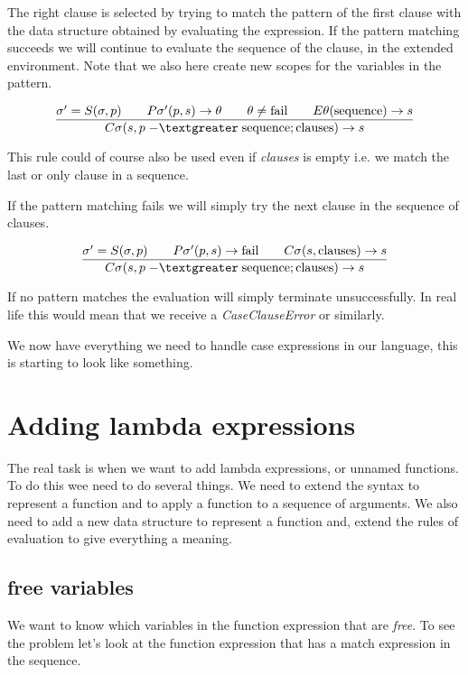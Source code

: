\documentclass[a4paper,11pt]{article}
\begin{document}
The right clause is selected by trying to match the pattern of the
first clause with the data structure obtained by evaluating the
expression. If the pattern matching succeeds we will continue to
evaluate the sequence of the clause, in the extended environment. Note
that we also here create new scopes for the variables in the pattern.

$$\frac{
  \sigma' = S(\sigma, p) \qquad
  P\sigma'(p, s) \rightarrow \theta \qquad
  \theta \not = {\rm fail} \qquad
  E\theta({\rm sequence}) \rightarrow s}{
C\sigma(s, p \;{\rm -\textgreater}\;    {\rm sequence} ; {\rm clauses}) \rightarrow s}$$

This rule could of course also be used even if {\em clauses} is empty
i.e. we match the last or only clause in a sequence.

If the pattern matching fails we will simply try the next clause in
the sequence of clauses.

$$\frac{
  \sigma' = S(\sigma, p) \qquad
  P\sigma'(p, s) \rightarrow {\rm fail} \qquad
  C\sigma(s, {\rm clauses}) \rightarrow s}{
C\sigma(s, p \;{\rm -\textgreater}\;  {\rm sequence} ; {\rm clauses}) \rightarrow s}$$

If no pattern matches the evaluation will simply terminate
unsuccessfully. In real life this would mean that we receive a {\em
  CaseClauseError} or similarly.

We now have everything we need to handle case expressions in our
language, this is starting to look like something.

\section{Adding lambda expressions}

The real task is when we want to add lambda expressions, or unnamed
functions. To do this wee need to do several things. We need to extend
the syntax to represent a function and to apply a function to a
sequence of arguments. We also need to add a new data structure to
represent a function and, extend the rules of evaluation to give
everything a meaning.


\subsection{free variables}

We want to know which variables in the function expression that are
{\em free}. To see the problem let's look at the function expression
that has a match expression in the sequence.
\end{document}
